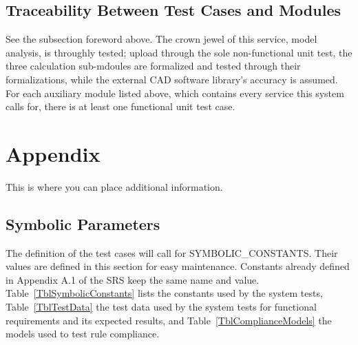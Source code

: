 \documentclass[12pt, titlepage]{article}
\begin{document}
\subsection{Traceability Between Test Cases and Modules}

See the subsection foreword above. The crown jewel of this service, model analysis, is throughly tested;
upload through the sole non-functional unit test, the three calculation sub-mdoules are formalized and tested
through their formalizations, while the external CAD software library's accuracy is assumed.
For each auxiliary module listed above, which contains every service this system calls for, there is at least one
functional unit test case.
				




\newpage

\section{Appendix}

This is where you can place additional information.

\subsection{Symbolic Parameters} \label{SecSymbolicParameters}

The definition of the test cases will call for SYMBOLIC\_CONSTANTS.
Their values are defined in this section for easy maintenance.
Constants already defined in Appendix A.1 of the SRS \citep{TroitskySRS} keep the
same name and value. Table~\ref{TblSymbolicConstants} lists the constants used
by the system tests, Table~\ref{TblTestData} the test data used by the system
tests for functional requirements and its expected results, and
Table~\ref{TblComplianceModels} the models used to test rule compliance.
\end{document}
